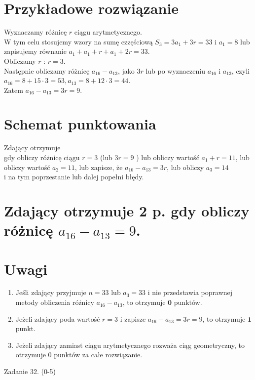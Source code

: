 \documentclass[10pt]{article}
\begin{document}
\section*{Przykładowe rozwiązanie}
Wyznaczamy różnicę $r$ ciągu arytmetycznego.\\
W tym celu stosujemy wzory na sumę czzęściową $S_{3}=3 a_{1}+3 r=33$ i $a_{1}=8$ lub zapisujemy równanie $a_{1}+a_{1}+r+a_{1}+2 r=33$.\\
Obliczamy $r$ : $r=3$.\\
Następnie obliczamy różnicę $a_{16}-a_{13}$, jako $3 r$ lub po wyznaczeniu $a_{16}$ i $a_{13}$, czyli\\
$a_{16}=8+15 \cdot 3=53, a_{13}=8+12 \cdot 3=44$.\\
Zatem $a_{16}-a_{13}=3 r=9$.

\section*{Schemat punktowania}
Zdający otrzymuje\\
gdy obliczy różnicę ciągu $r=3$ (lub $3 r=9$ ) lub obliczy wartość $a_{1}+r=11$, lub obliczy wartość $a_{2}=11$, lub zapisze, że $a_{16}-a_{13}=3 r$, lub obliczy $a_{3}=14$\\
i na tym poprzestanie lub dalej popełni błędy.

\section*{Zdający otrzymuje 2 p. gdy obliczy różnicę $a_{16}-a_{13}=9$.}
\section*{Uwagi}
\begin{enumerate}
  \item Jeśli zdający przyjmuje $n=33$ lub $a_{3}=33$ i nie przedstawia poprawnej metody obliczenia różnicy $a_{16}-a_{13}$, to otrzymuje $\mathbf{0}$ punktów.
  \item Jeżeli zdający poda wartość $r=3$ i zapisze $a_{16}-a_{13}=3 r=9$, to otrzymuje $\mathbf{1}$ punkt.
  \item Jeżeli zdający zamiast ciągu arytmetycznego rozważa ciąg geometryczny, to otrzymuje 0 punktów za całe rozwiązanie.
\end{enumerate}

Zadanie 32. (0-5)
\end{document}
